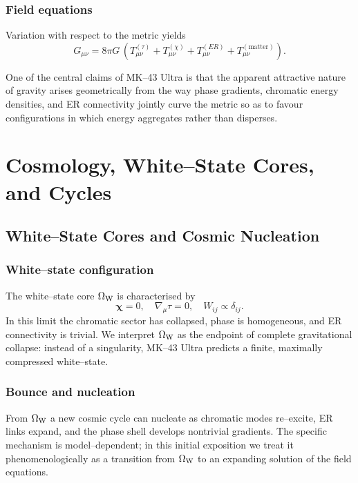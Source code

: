 \section{Field equations}

Variation with respect to the metric yields
\begin{equation}
  G_{\mu\nu}
  =
  8\pi G\, \left(
    T^{(\tau)}_{\mu\nu}
    + T^{(\chi)}_{\mu\nu}
    + T^{(ER)}_{\mu\nu}
    + T^{\mathrm{(matter)}}_{\mu\nu}
  \right).
\end{equation}

One of the central claims of MK--43 Ultra is that the apparent attractive nature of gravity arises geometrically from the way phase gradients, chromatic energy densities, and ER connectivity jointly curve the metric so as to favour configurations in which energy aggregates rather than disperses.

\part{Cosmology, White--State Cores, and Cycles}

\chapter{White--State Cores and Cosmic Nucleation}

\section{White--state configuration}

The white--state core $\Omega_{\mathrm{W}}$ is characterised by
\[
  \bm{\chi} = 0, \quad \nabla_\mu \tau = 0, \quad W_{ij} \propto \delta_{ij}.
\]
In this limit the chromatic sector has collapsed, phase is homogeneous, and ER connectivity is trivial.
We interpret $\Omega_{\mathrm{W}}$ as the endpoint of complete gravitational collapse: instead of a singularity, MK--43 Ultra predicts a finite, maximally compressed white--state.

\section{Bounce and nucleation}

From $\Omega_{\mathrm{W}}$ a new cosmic cycle can nucleate as chromatic modes re--excite, ER links expand, and the phase shell develops nontrivial gradients.
The specific mechanism is model--dependent; in this initial exposition we treat it phenomenologically as a transition from $\Omega_{\mathrm{W}}$ to an expanding solution of the field equations.

